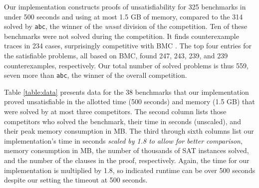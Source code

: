 \documentclass{llncs}
\begin{document}
Our implementation constructs proofs of unsatisfiability for 325
benchmarks in under 500 seconds and using at most 1.5 GB of memory,
compared to the 314 solved by {\tt abc}, the winner of the {\it unsat}
division of the competition.  Ten of these benchmarks were not solved
during the competition.  It finds counterexample traces in 234 cases,
surprisingly competitive with BMC \cite{Biere+Others/1999}.  The top
four entries for the satisfiable problems, all based on BMC, found
247, 243, 239, and 239 counterexamples, respectively.  Our total
number of solved problems is thus 559, seven more than {\tt abc}, the
winner of the overall competition.

Table \ref{table:data} presents data for the 38 benchmarks that our
implementation proved unsatisfiable in the allotted time (500 seconds)
and memory (1.5 GB) that were solved by at most three competitors.  The
second column lists those competitors who solved the benchmark, their
time in seconds (unscaled), and their peak memory consumption in MB.
The third through sixth columns list our implementation's time in
seconds {\it scaled by 1.8 to allow for better comparison}, memory
consumption in MB, the number of thousands of SAT instances solved,
and the number of the clauses in the proof, respectively.  Again, the
time for our implementation is multiplied by 1.8, so indicated runtime
can be over 500 seconds despite our setting the timeout at 500
seconds.
\end{document}
